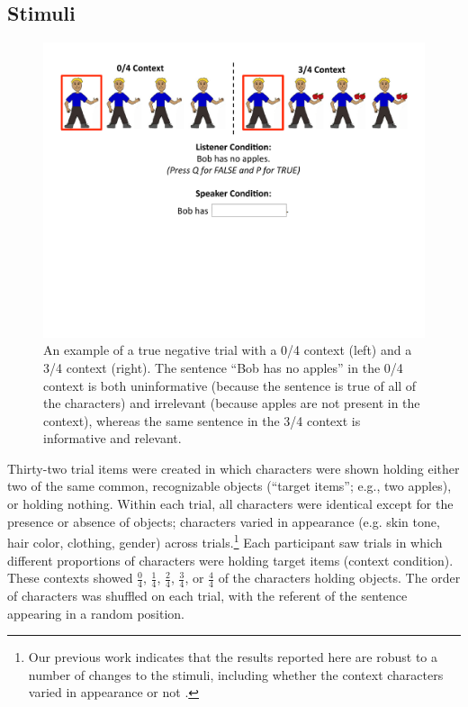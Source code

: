 \documentclass[man, noapacite]{apa2}
\begin{document}
\subsection{Stimuli}

\begin{figure}[t]
\begin{center} 
\includegraphics[width=6in]{figures/trialfig.pdf}
\caption{\label{fig:trial} An example of a true negative trial with a 0/4 context (left) and a 3/4 context (right).  The sentence ``Bob has no apples'' in the 0/4 context is both uninformative (because the sentence is true of all of the characters) and irrelevant (because apples are not present in the context), whereas the same sentence in the 3/4 context is informative and relevant. }
\vspace{-5mm}
\end{center} 
\end{figure}

Thirty-two trial items were created in which characters were shown holding either two of the same common, recognizable objects (``target items''; e.g., two apples), or holding nothing.  Within each trial, all characters were identical except for the presence or absence of objects; characters varied in appearance (e.g. skin tone, hair color, clothing, gender) across trials.\footnote{Our previous work indicates that the results reported here are robust to a number of changes to the stimuli, including whether the context characters varied in appearance or not \cite{nordmeyer2014}.} Each participant saw trials in which different proportions of characters were holding target items (context condition).  These contexts showed $\frac{0}{4}$, $\frac{1}{4}$, $\frac{2}{4}$, $\frac{3}{4}$, or $\frac{4}{4}$ of the characters holding objects. The order of characters was shuffled on each trial, with the referent of the sentence appearing in a random position. 
\end{document}
